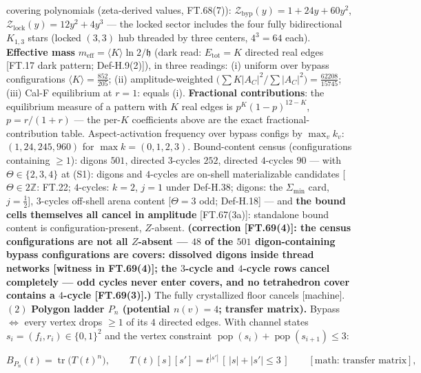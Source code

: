 \begin{theorem}
covering polynomials (zeta-derived values, FT.68(7)): $\mathcal Z_{\mathrm{byp}}(y)=1+24y+60y^2$, $\mathcal Z_{\mathrm{lock}}(y)=12y^2+4y^3$ — the locked sector includes the four fully bidirectional $K_{1,3}$ stars (locked $(3,3)$ hub threaded by three centers, $4^3=64$ each). \textbf{Effective mass} $m_{\mathrm{eff}}=\langle K\rangle\ln2/\mathfrak h$ (dark read: $E_{\mathrm{tot}}=K$ directed real edges [FT.17 dark pattern; Def-H.9(2)]), in three readings: (i) uniform over bypass configurations $\langle K\rangle=\tfrac{852}{205}$; (ii) amplitude-weighted $\bigl(\sum K|A_C|^2/\sum|A_C|^2\bigr)=\tfrac{62208}{15745}$; (iii) Cal-F equilibrium at $r{=}1$: equals (i). \textbf{Fractional contributions}: the equilibrium measure of a pattern with $K$ real edges is $p^K(1-p)^{12-K}$, $p=r/(1+r)$ — the per-$K$ coefficients above are the exact fractional-contribution table. Aspect-activation frequency over bypass configs by $\max_vk_v$: $(1,24,245,960)$ for $\max k=(0,1,2,3)$. Bound-content census (configurations containing $\ge1$): digons $501$, directed $3$-cycles $252$, directed $4$-cycles $90$ — with $\Theta\in\{2,3,4\}$ at (S1): digons and $4$-cycles are on-shell materializable candidates [$\Theta\in2\mathbb Z$: FT.22; $4$-cycles: $k=2$, $j=1$ under Def-H.38; digons: the $\Sigma_{\min}$ card, $j=\tfrac12$], $3$-cycles off-shell arena content [$\Theta=3$ odd; Def-H.18] — and \textbf{the bound cells themselves all cancel in amplitude} [FT.67(3a)]: standalone bound content is configuration-present, $Z$-absent. \textbf{(correction [FT.69(4)]: the census configurations are not all $Z$-absent — $48$ of the $501$ digon-containing bypass configurations are covers: dissolved digons inside thread networks [witness in FT.69(4)]; the $3$-cycle and $4$-cycle rows cancel completely — odd cycles never enter covers, and no tetrahedron cover contains a $4$-cycle [FT.69(3)].)} The fully crystallized floor cancels [machine]. $(2)$ \textbf{Polygon ladder $P_n$ (potential $n(v)=4$; transfer matrix).} Bypass $\iff$ every vertex drops $\ge1$ of its $4$ directed edges. With channel states $s_i=(f_i,r_i)\in\{0,1\}^2$ and the vertex constraint $\operatorname{pop}(s_i)+\operatorname{pop}(s_{i+1})\le3$:

\[
B_{P_n}(t)=\operatorname{tr}\bigl(T(t)^n\bigr),\qquad T(t)[s][s']=t^{|s'|}\,[\,|s|+|s'|\le3\,]\qquad[\text{math: transfer matrix}],
\]


\end{theorem}
